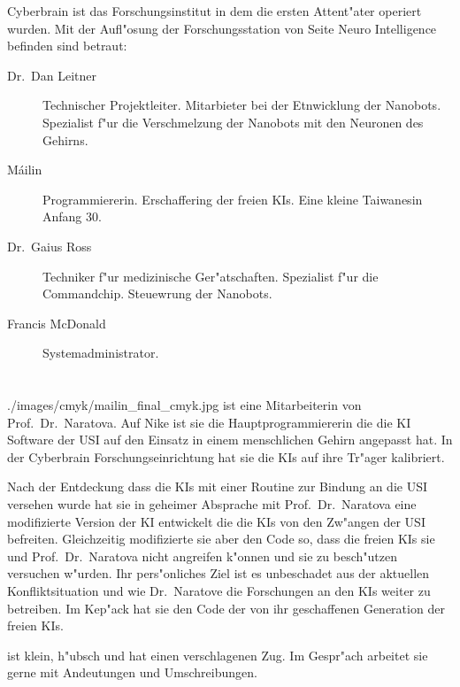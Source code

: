 
Cyberbrain ist das Forschungsinstitut in dem die ersten Attent"ater operiert wurden. Mit der Aufl"osung der Forschungsstation von Seite Neuro Intelligence befinden sind betraut:

\begin{description}
    \item[Dr.~Dan Leitner] Technischer Projektleiter. Mitarbieter bei der Etnwicklung der Nanobots. Spezialist f"ur die Verschmelzung 
        der  Nanobots mit den Neuronen des Gehirns.
    \item[M\'{a}ilin] Programmiererin. Erschaffering der freien KIs. Eine kleine Taiwanesin Anfang 30. 
    \item[Dr.~Gaius Ross] Techniker f"ur medizinische Ger"atschaften. Spezialist f"ur die Commandchip. Steuewrung der Nanobots.
    \item[Francis McDonald] Systemadministrator.
\end{description}

\section[Mailin]{\ml{}}

\begin{sideimagebox}[r]{0.6}{./images/cmyk/mailin_final_cmyk.jpg}{\ml}
    \ml{} ist eine Mitarbeiterin von Prof.~Dr.~Naratova. Auf Nike ist sie die Hauptprogrammiererin die die KI Software der USI auf den Einsatz in einem menschlichen Gehirn angepasst hat.  In der Cyberbrain Forschungseinrichtung hat sie die KIs auf ihre Tr"ager kalibriert.

    Nach der Entdeckung dass die KIs mit einer Routine zur Bindung an die USI versehen wurde hat sie in geheimer Absprache mit Prof.~Dr.~Naratova eine modifizierte Version der KI entwickelt die die KIs von den Zw"angen der USI befreiten. Gleichzeitig modifizierte sie aber den Code so, dass die freien KIs sie und Prof.~Dr.~Naratova nicht angreifen k"onnen und sie zu besch"utzen versuchen w"urden. Ihr pers"onliches Ziel ist es unbeschadet aus der aktuellen Konfliktsituation und wie Dr.~Naratove die Forschungen an den KIs weiter zu betreiben. Im Kep"ack hat sie den Code der von ihr geschaffenen Generation der freien KIs.

    \ml{} ist klein, h"ubsch und hat einen verschlagenen Zug. Im Gespr"ach arbeitet sie gerne mit Andeutungen und Umschreibungen.
\end{sideimagebox}

